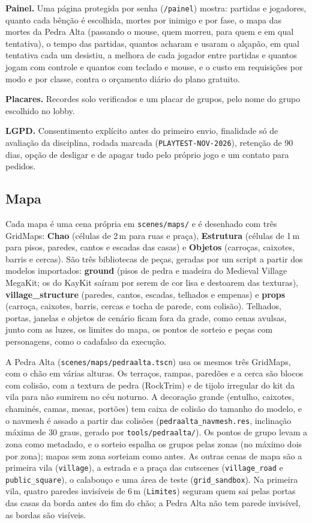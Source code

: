 \documentclass[11pt,a4paper]{article}
\begin{document}
\textbf{Painel.} Uma página protegida por senha (\texttt{/painel}) mostra: partidas e jogadores, quanto cada bênção é escolhida, mortes por inimigo e por fase, o mapa das mortes da Pedra Alta (passando o mouse, quem morreu, para quem e em qual tentativa), o tempo das partidas, quantos acharam e usaram o alçapão, em qual tentativa cada um desistiu, a melhora de cada jogador entre partidas e quantos jogam com controle e quantos com teclado e mouse, e o custo em requisições por modo e por classe, contra o orçamento diário do plano gratuito.

\textbf{Placares.} Recordes solo verificados e um placar de grupos, pelo nome do grupo escolhido no lobby.

\textbf{LGPD.} Consentimento explícito antes do primeiro envio, finalidade só de avaliação da disciplina, rodada marcada (\texttt{PLAYTEST-NOV-2026}), retenção de 90 dias, opção de desligar e de apagar tudo pelo próprio jogo e um contato para pedidos.

\subsection{Mapa}

Cada mapa é uma cena própria em \texttt{scenes/maps/} e é desenhado com três GridMaps: \textbf{Chao} (células de 2\,m para ruas e praça), \textbf{Estrutura} (células de 1\,m para pisos, paredes, cantos e escadas das casas) e \textbf{Objetos} (carroças, caixotes, barris e cercas). São três bibliotecas de peças, geradas por um script a partir dos modelos importados: \textbf{ground} (pisos de pedra e madeira do Medieval Village MegaKit; os do KayKit saíram por serem de cor lisa e destoarem das texturas), \textbf{village\_structure} (paredes, cantos, escadas, telhados e empenas) e \textbf{props} (carroça, caixotes, barris, cercas e tocha de parede, com colisão). Telhados, portas, janelas e objetos de cenário ficam fora da grade, como cenas avulsas, junto com as luzes, os limites do mapa, os pontos de sorteio e peças com personagens, como o cadafalso da execução.

A Pedra Alta (\texttt{scenes/maps/pedraalta.tscn}) usa os mesmos três GridMaps, com o chão em várias alturas. Os terraços, rampas, paredões e a cerca são blocos com colisão, com a textura de pedra (RockTrim) e de tijolo irregular do kit da vila para não sumirem no céu noturno. A decoração grande (entulho, caixotes, chaminés, camas, mesas, portões) tem caixa de colisão do tamanho do modelo, e o navmesh é assado a partir das colisões (\texttt{pedraalta\_navmesh.res}, inclinação máxima de 30 graus, gerado por \texttt{tools/pedraalta/}). Os pontos de grupo levam a zona como metadado, e o sorteio espalha os grupos pelas zonas (no máximo dois por zona); mapas sem zona sorteiam como antes. As outras cenas de mapa são a primeira vila (\texttt{village}), a estrada e a praça das cutscenes (\texttt{village\_road} e \texttt{public\_square}), o calabouço e uma área de teste (\texttt{grid\_sandbox}). Na primeira vila, quatro paredes invisíveis de 6\,m (\texttt{Limites}) seguram quem sai pelas portas das casas da borda antes do fim do chão; a Pedra Alta não tem parede invisível, as bordas são visíveis.
\end{document}
